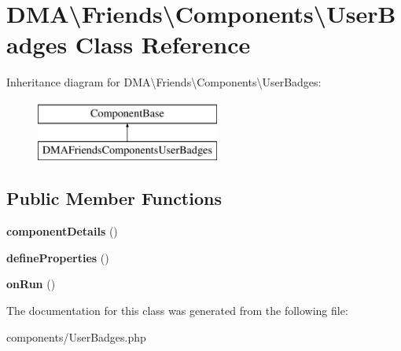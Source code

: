 \hypertarget{classDMA_1_1Friends_1_1Components_1_1UserBadges}{\section{D\-M\-A\textbackslash{}Friends\textbackslash{}Components\textbackslash{}User\-Badges Class Reference}
\label{classDMA_1_1Friends_1_1Components_1_1UserBadges}
}
Inheritance diagram for D\-M\-A\textbackslash{}Friends\textbackslash{}Components\textbackslash{}User\-Badges\-:\begin{figure}[H]
\begin{center}
\leavevmode
\includegraphics[height=2.000000cm]{d8/d01/classDMA_1_1Friends_1_1Components_1_1UserBadges}
\end{center}
\end{figure}
\subsection*{Public Member Functions}
\begin{DoxyCompactItemize}
\item 
\hypertarget{classDMA_1_1Friends_1_1Components_1_1UserBadges_a6e3e13d8f4a57f8845f2c6371c8dbd58}{{\bfseries component\-Details} ()}\label{classDMA_1_1Friends_1_1Components_1_1UserBadges_a6e3e13d8f4a57f8845f2c6371c8dbd58}

\item 
\hypertarget{classDMA_1_1Friends_1_1Components_1_1UserBadges_aae166c2a0b03d1048472286433f21970}{{\bfseries define\-Properties} ()}\label{classDMA_1_1Friends_1_1Components_1_1UserBadges_aae166c2a0b03d1048472286433f21970}

\item 
\hypertarget{classDMA_1_1Friends_1_1Components_1_1UserBadges_acec1de754996d056cdc99efa976826b9}{{\bfseries on\-Run} ()}\label{classDMA_1_1Friends_1_1Components_1_1UserBadges_acec1de754996d056cdc99efa976826b9}

\end{DoxyCompactItemize}


The documentation for this class was generated from the following file\-:\begin{DoxyCompactItemize}
\item 
components/User\-Badges.\-php\end{DoxyCompactItemize}
